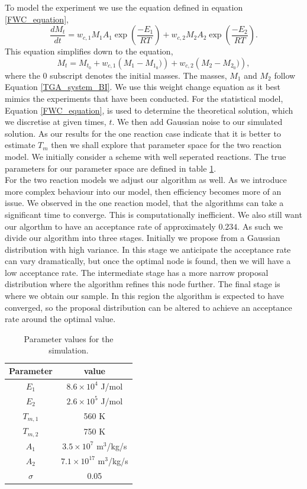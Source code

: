 To model the experiment we use the equation defined in equation \ref{FWC_equation},
\begin{equation}
\frac{dM_t}{dt}=w_{c,1}M_1A_1\exp\left(\frac{-E_1}{RT}\right)+w_{c,2}M_2A_2\exp\left(\frac{-E_2}{RT}\right). \label{FWC_equation}
\end{equation}
This equation simplifies down to the equation,
\begin{equation}
M_t=M_{t_0}+w_{c,1}\left(M_1-M_{1_0})\right)+w_{c,2}\left(M_2-M_{2_0})\right),
\end{equation}
where the $0$ subscript denotes the initial masses. The masses, $M_1$ and $M_2$ follow Equation \ref{TGA_system_BI}. We use this weight change equation as it best mimics the experiments that have been conducted. For the statistical model, Equation \ref{FWC_equation}, is used to determine the theoretical solution, which we discretise at given times, $t$. We then add Gaussian noise to our simulated solution.
As our results for the one reaction case indicate that it is better to estimate $T_m$ then we shall explore that parameter space for the two reaction model. We initially consider a scheme with well seperated reactions. The true parameters for our parameter space are defined in table \ref{sim_paras}.\\
For the two reaction models we adjust our algorithm as well. As we introduce more complex behaviour into our model, then efficiency becomes more of an issue. We observed in the one reaction model, that the algorithms can take a significant time to converge. This is computationally inefficient. We also still want our algorthm to have an acceptance rate of approximately $0.234$. As such we divide our algorithm into three stages. Initially we propose from a Gaussian distribution with high variance. In this stage we anticipate the acceptance rate can vary dramatically, but once the optimal node is found, then we will have a low acceptance rate. The intermediate stage has a more narrow proposal distribution where the algorithm refines this node further. The final stage is where we obtain our sample. In this region the algorithm is expected to have converged, so the proposal distribution can be altered to achieve an acceptance rate around the optimal value.\\ 

\begin{table}[h!]
\centering
\begin{tabular}{|c|c|}
\hline
Parameter & value \\ \hline
$E_1$ & $8.6 \times 10^4$ J/mol \\ \hline
$E_2$ & $2.6 \times 10^5$ J/mol\\ \hline
$T_{m,1}$ & 560 K\\ \hline
$T_{m,2}$ & 750 K\\ \hline
$A_1$ & $3.5 \times 10^7 $ m$^3$/kg/s\\ \hline
$A_2$ & $7.1 \times 10^{17} $ m$^3$/kg/s \\ \hline
$\sigma$ & 0.05 \\ \hline
\end{tabular}
\caption{Parameter values for the simulation.}
\label{sim_paras}
\end{table} 

